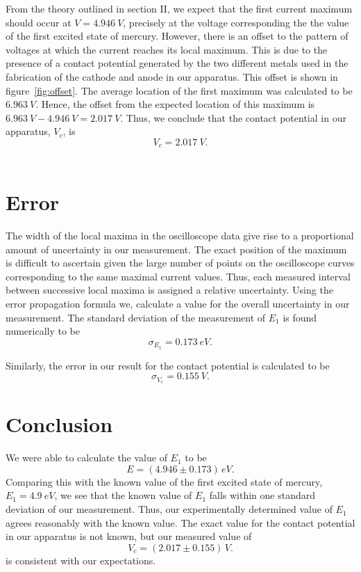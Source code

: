 \documentclass[aps, reprint,amsmath,amssymb]{revtex4-1} %
\begin{document}
From the theory outlined in section II, we expect that the first current maximum should occur at $V = \SI{4.946}{V}$, precisely at the voltage corresponding the the value of the first excited state of mercury. However, there is an offset to the pattern of voltages at which the current reaches its local maximum. This is due to the presence of a contact potential generated by the two different metals used in the fabrication of the cathode and anode in our apparatus. This offset is shown in figure~\ref{fig:offset}. The average location of the first maximum was calculated to be $\SI{6.963}{V}$. Hence, the offset from the expected location of this maximum is $\SI{6.963}{V} - \SI{4.946}{V} = \SI{2.017}{V}$. Thus, we conclude that the contact potential in our apparatus, $V_c$, is
\[
	V_c = \SI{2.017}{V}.
\] \\

\section{Error}

The width of the local maxima in the oscilloscope data give rise to a proportional amount of uncertainty in our measurement. The exact position of the maximum is difficult to ascertain given the large number of points on the oscilloscope curves corresponding to the same maximal current values. Thus, each measured interval between successive local maxima is assigned a relative uncertainty. Using the error propagation formula we, calculate a value for the overall uncertainty in our measurement. The standard deviation of the measurement of $E_1$ is found numerically to be
\[
    \sigma_{E_1} = \SI{0.173}{eV}.
\]

Similarly, the error in our result for the contact potential is calculated to be
\[
    \sigma_{V_c} = \SI{0.155}{V}.
\]

\section{Conclusion}
We were able to calculate the value of $E_1$ to be
\[
    E = (4.946 \pm 0.173) \, \si{eV}.
\]
Comparing this with the known value of the first excited state of mercury, $E_1 = \SI{4.9}{eV}$, we see that the known value of $E_1$ falls within one standard deviation of our measurement. Thus, our experimentally determined value of $E_1$ agrees reasonably with the
known value. The exact value for the contact potential in our apparatus is not known, but our measured value of 
\[
    V_c = (2.017 \pm 0.155) \, \si{V}.
\]
is consistent with our expectations.
\end{document}
